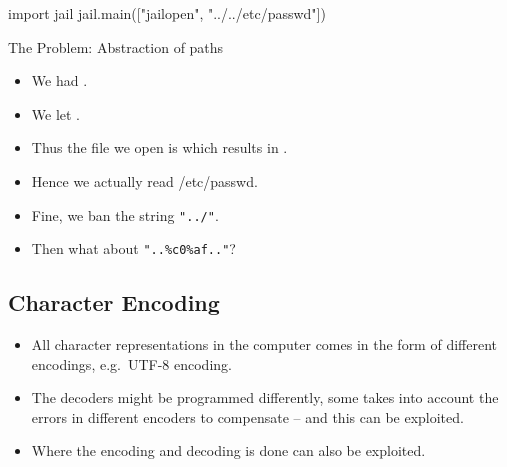 \begin{frame}[fragile]
  \begin{example}
    \begin{pycode}
import jail
jail.main(["jailopen", "../../etc/passwd"])
    \end{pycode}
  \end{example}
\end{frame}

\begin{frame}
  \begin{alertblock}{The Problem: Abstraction of paths}
    \begin{itemize}
      \item We had .
      \item We let .
      \item Thus the file we open is  
        which results in .
      \item Hence we actually read /etc/passwd.
    \end{itemize}
  \end{alertblock}
\end{frame}

\begin{frame}
  \begin{itemize}
    \item Fine, we ban the string \texttt{"../"}.

    \item Then what about \texttt{"..\%c0\%af.."}?

  \end{itemize}
\end{frame}

\subsection{Character Encoding}

\begin{frame}
  \begin{itemize}
    \item All character representations in the computer comes in the form of 
      different encodings, e.g.\ UTF-8 encoding.

    \item The decoders might be programmed differently, some takes into account 
      the errors in different encoders to compensate -- and this can be 
      exploited.

    \item Where the encoding and decoding is done can also be exploited.

  \end{itemize}
\end{frame}

